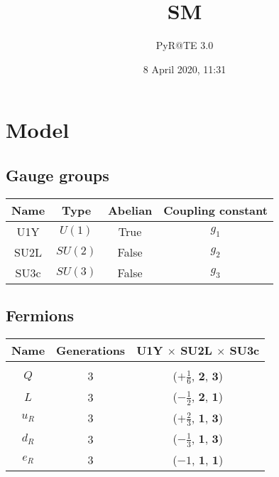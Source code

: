 \documentclass[12pt]{article}
\title{SM}
\author{PyR@TE 3.0}
\date{8 April 2020, 11:31}
\begin{document}
    \maketitle
    \tableofcontents
    \clearpage

\section{Model}{

\subsection{Gauge groups}

\begin{table}[h]
\renewcommand{\arraystretch}{1.3}
\centering
\begin{tabular}{c@{\hskip .66cm}c@{\hskip .66cm}c@{\hskip .5cm}c}
\hline
Name & Type & Abelian & Coupling constant \\ \hline
U1Y & $U(1)$ & True & $g_1$ \\
SU2L & $SU(2)$ & False & $g_2$ \\
SU3c & $SU(3)$ & False & $g_3$ \\ \hline
\end{tabular}
\end{table}

\subsection{Fermions}

\begin{table}[h]
\renewcommand{\arraystretch}{1.15}
\centering
\begin{tabular}{c@{\hskip .66cm}c@{\hskip .66cm}c}
\hline
Name & Generations & U1Y $\times$ SU2L $\times$ SU3c\\ \hline \\ [-2ex]
$Q$ & 3 & ($+\frac{1}{6}$, $\mathbf{2}$, $\mathbf{3}$) \\[.2cm]
$L$ & 3 & ($- \frac{1}{2}$, $\mathbf{2}$, $\mathbf{1}$) \\[.2cm]
$u_R$ & 3 & ($+\frac{2}{3}$, $\mathbf{1}$, $\mathbf{3}$) \\[.2cm]
$d_R$ & 3 & ($- \frac{1}{3}$, $\mathbf{1}$, $\mathbf{3}$) \\[.2cm]
$e_R$ & 3 & ($-1$, $\mathbf{1}$, $\mathbf{1}$) \\[.1cm] \hline
\end{tabular}
\end{table}

}
\end{document}
